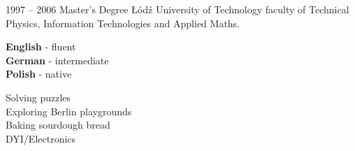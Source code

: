 \documentclass[8pt]{developercv} %
\begin{document}

\begin{entrylist}
	\entry
		{1997 -- 2006}
		{Master's Degree}
		{Łódź University of Technology}
		{faculty of Technical Physics, Information Technologies and Applied Maths.}
\end{entrylist}


\begin{minipage}[t]{0.3\textwidth}
	\vspace{-\baselineskip} %

	
	\textbf{English} - fluent\\
	\textbf{German} - intermediate\\
	\textbf{Polish} - native
\end{minipage}
\hfill
\begin{minipage}[t]{0.3\textwidth}
	\vspace{-\baselineskip} %
	
	
	Solving puzzles\\
	Exploring Berlin playgrounds\\
	Baking sourdough bread\\
	DYI/Electronics
\end{minipage}
\hfill

\end{document}
